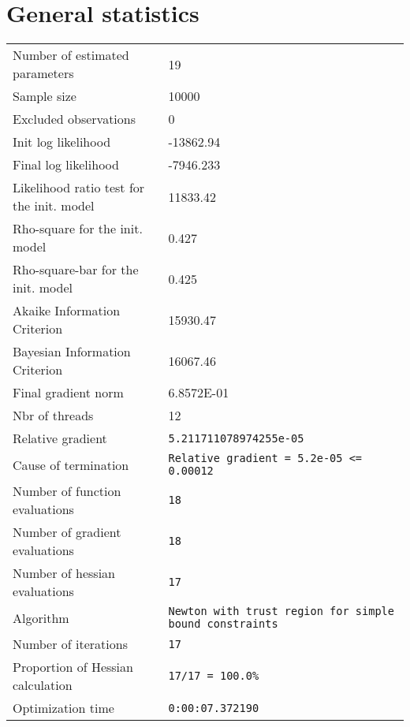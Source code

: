 



\section{General statistics}
\begin{tabular}{ll}
Number of estimated parameters & 19 \\
Sample size & 10000 \\
Excluded observations & 0 \\
Init log likelihood & -13862.94 \\
Final log likelihood & -7946.233 \\
Likelihood ratio test for the init. model & 11833.42 \\
Rho-square for the init. model & 0.427 \\
Rho-square-bar for the init. model & 0.425 \\
Akaike Information Criterion & 15930.47 \\
Bayesian Information Criterion & 16067.46 \\
Final gradient norm & 6.8572E-01 \\
Nbr of threads & 12 \\
Relative gradient & \verb$5.211711078974255e-05$ \\
Cause of termination & \verb$Relative gradient = 5.2e-05 <= 0.00012$ \\
Number of function evaluations & \verb$18$ \\
Number of gradient evaluations & \verb$18$ \\
Number of hessian evaluations & \verb$17$ \\
Algorithm & \verb$Newton with trust region for simple bound constraints$ \\
Number of iterations & \verb$17$ \\
Proportion of Hessian calculation & \verb$17/17 = 100.0%$ \\
Optimization time & \verb$0:00:07.372190$ \\
\end{tabular}

